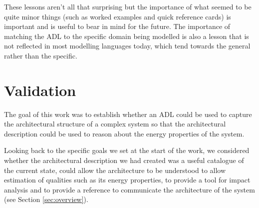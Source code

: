   These lessons aren't all that surprising but the importance of what seemed to be quite minor things (such as worked examples and quick reference cards) is important and is useful to bear in mind for the future.  The importance of matching the ADL to the specific domain being modelled is also a lesson that is not reflected in most modelling languages today, which tend towards the general rather than the specific.  

  \section{Validation}

  The goal of this work was to establish whether an ADL could be used to capture the architectural structure of a complex system so that the architectural description could be used to reason about the energy properties of the system.

  Looking back to the specific goals we set at the start of the work, we considered whether the architectural description we had created was a useful catalogue of the current state, could allow the architecture to be understood to allow estimation of qualities such as its energy properties, to provide a tool for impact analysis and to provide a reference to communicate the architecture of the system (see Section \ref{sec:overview}).
  
